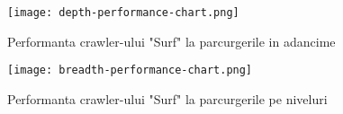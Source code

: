 \begin{figure}[ht]
\begin{center}
	\texttt{[image: depth-performance-chart.png]}
	\caption{Performanta crawler-ului "Surf" la parcurgerile in adancime \cite{diagram-icons-sources, aws-icons-source, microsoft-excel}}\par\medskip 

\end{center}
\end{figure}

\begin{figure}[ht]
\begin{center}
	\texttt{[image: breadth-performance-chart.png]}
	\caption{Performanta crawler-ului "Surf" la parcurgerile pe niveluri \cite{diagram-icons-sources, aws-icons-source, microsoft-excel}}\par\medskip 

\end{center}
\end{figure}

